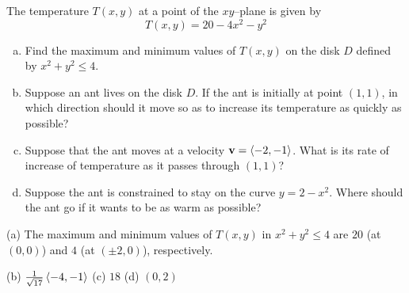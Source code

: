 \begin{question}[M200 2009D] %
The temperature $T(x,y)$ at a point of the $xy$--plane is given by
\begin{equation*}
T(x,y) = 20 - 4x^2 - y^2 
\end{equation*}
\begin{enumerate}[(a)]
\item
Find the maximum and minimum values of $T(x,y)$ on the disk $D$ 
defined by $x^2 + y^2 \le 4$.

\item
Suppose an ant lives on the disk $D$. If the ant is initially at point 
$(1, 1)$, in which direction should it move so as to increase its 
temperature as quickly as possible?


\item
Suppose that the ant moves at a velocity $\mathbf{v} = \left< -2, -1\right>$. 
What is its rate of increase of temperature as it passes through $(1, 1)$?

\item 
Suppose the ant is constrained to stay on the curve $y = 2 - x^2$. 
Where should the ant go if it wants to be as warm as possible?

\end{enumerate}
\end{question}

%

\begin{answer}
(a) The maximum and minimum values of $T(x,y)$ in $x^2+y^2\le 4$
     are $20$ (at $(0,0)$) and  $4$ (at $(\pm 2,0)$), respectively.

(b) $\frac{1}{\sqrt{17}}\left< -4,-1\right>$\qquad
(c) $18$\qquad
(d) $(0,2)$
\end{answer}

